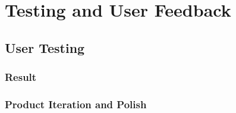 \chapter{Testing and User Feedback}
\section{User Testing}
\subsection{Result}
\subsection{Product Iteration and Polish}